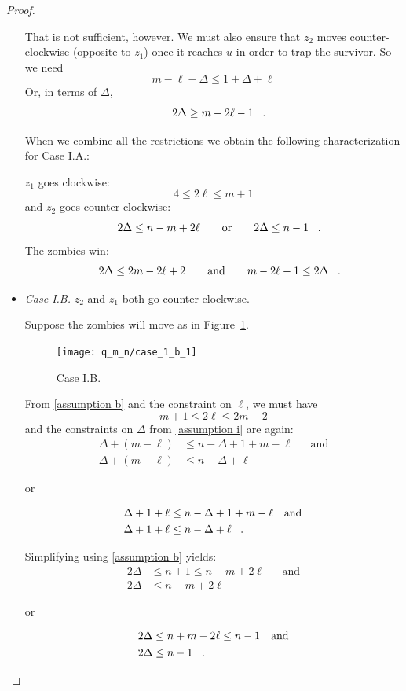 \begin{proof}
\begin{proofpart}
\begin{itemize}
  That is not sufficient, however. We must also ensure that $z_2$ moves
  counter-clockwise (opposite to $z_1$) once it reaches $u$ in order to trap the
  survivor. So we need
  \[ m - \ell - \Delta \leq 1 + \Delta + \ell \]
  Or, in terms of $\Delta$,
  \[ 2 \Delta \geq m - 2\ell  -1 \mperiod \]

  When we combine all the restrictions we obtain the following characterization for Case I.A.:

  $z_1$ goes clockwise:
  \[ 4 \leq 2 \ell \leq m + 1 \]
  and $z_2$ goes counter-clockwise:
  \[ 2 \Delta \leq n - m + 2\ell \qquad \text{or} \qquad 2 \Delta \leq n - 1 \mperiod \]
  The zombies win:
  \[ 2 \Delta \leq 2 m- 2 \ell + 2 \qquad \text{and} \qquad m - 2\ell  -1 \leq 2 \Delta \mperiod \]

  \item \textit{Case I.B.} $z_2$ and $z_1$ both go counter-clockwise.

  Suppose the zombies will move as in Figure~\ref{fig:case_1_b_1}.
  \begin{figure}
    \centering
    \texttt{[image: q\_m\_n/case\_1\_b\_1]}
    \caption{Case I.B. \label{fig:case_1_b_1}}
  \end{figure}

  From \ref{assumption b} and the constraint on $\ell$, we must have
  \[ m + 1 \leq 2 \ell \leq 2m - 2 \]
  and the constraints on $\Delta$ from \ref{assumption i} are again:
  \begin{align*}
   \Delta + (m - \ell) &\leq n - \Delta + 1 + m - \ell && \text{and} \\
   \Delta + (m - \ell) &\leq n - \Delta + \ell
  \end{align*}
  \begin{center}or\end{center}
  \begin{align*}
   \Delta + 1 + \ell &\leq n - \Delta + 1 + m - \ell && \text{and} \\
   \Delta + 1 + \ell &\leq n - \Delta + \ell \mperiod
  \end{align*}

  Simplifying using \ref{assumption b} yields:
  \begin{align*}
   2 \Delta &\leq n+1 \leq n-m+2\ell && \text{and} \\
   2 \Delta &\leq n - m + 2\ell
  \end{align*}
  \begin{center}or\end{center}
  \begin{align*}
   2 \Delta &\leq n+m -2 \ell \leq n-1 && \text{and} \\
   2 \Delta &\leq n -1 \mperiod
  \end{align*}


\end{itemize}
\end{proofpart}
\end{proof}
